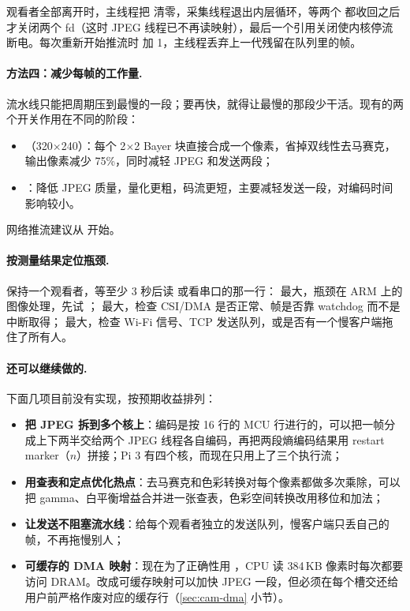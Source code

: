 观看者全部离开时，主线程把  清零，采集线程退出内层循环，等两个  都收回之后才关闭两个 fd（这时 JPEG 线程已不再读映射），最后一个引用关闭使内核停流断电。每次重新开始推流时  加 1，主线程丢弃上一代残留在队列里的帧。

\paragraph{方法四：减少每帧的工作量.} 流水线只能把周期压到最慢的一段；要再快，就得让最慢的那段少干活。现有的两个开关作用在不同的阶段：

\begin{itemize}
  \item {}（320$\times$240）：每个 2$\times$2 Bayer 块直接合成一个像素，省掉双线性去马赛克，输出像素减少 75\%，同时减轻 JPEG 和发送两段；
  \item {}：降低 JPEG 质量，量化更粗，码流更短，主要减轻发送一段，对编码时间影响较小。
\end{itemize}

网络推流建议从  开始。

\paragraph{按测量结果定位瓶颈.} 保持一个观看者，等至少 3 秒后读  或看串口的那一行： 最大，瓶颈在 ARM 上的图像处理，先试 ； 最大，检查 CSI/DMA 是否正常、帧是否靠 watchdog 而不是中断取得； 最大，检查 Wi-Fi 信号、TCP 发送队列，或是否有一个慢客户端拖住了所有人。

\paragraph{还可以继续做的.} 下面几项目前没有实现，按预期收益排列：
\begin{itemize}
  \item \textbf{把 JPEG 拆到多个核上}：编码是按 16 行的 MCU 行进行的，可以把一帧分成上下两半交给两个 JPEG 线程各自编码，再把两段熵编码结果用 restart marker（$n$）拼接；Pi 3 有四个核，而现在只用上了三个执行流；
  \item \textbf{用查表和定点优化热点}：去马赛克和色彩转换对每个像素都做多次乘除，可以把 gamma、白平衡增益合并进一张查表，色彩空间转换改用移位和加法；
  \item \textbf{让发送不阻塞流水线}：给每个观看者独立的发送队列，慢客户端只丢自己的帧，不再拖慢别人；
  \item \textbf{可缓存的 DMA 映射}：现在为了正确性用 ，CPU 读 384\,KB 像素时每次都要访问 DRAM。改成可缓存映射可以加快 JPEG 一段，但必须在每个槽交还给用户前严格作废对应的缓存行（\ref{sec:cam-dma} 小节）。
\end{itemize}

